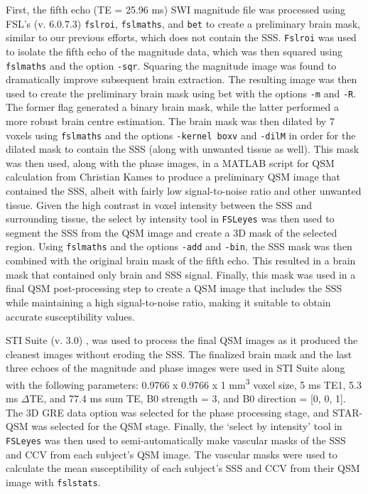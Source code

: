 \documentclass[
true
]{sn-jnl}
\begin{document}
First, the fifth echo (TE = 25.96 ms) SWI magnitude file was processed
using FSL's (v. 6.0.7.3)
\citep{woolrichBayesianAnalysisNeuroimaging2009} \texttt{fslroi},
\texttt{fslmaths}, and \texttt{bet} \citep{smithFastRobustAutomated2002}
to create a preliminary brain mask, similar to our previous efforts,
which does not contain the SSS. \texttt{Fslroi} was used to isolate the
fifth echo of the magnitude data, which was then squared using
\texttt{fslmaths} and the option \texttt{-sqr}. Squaring the magnitude
image was found to dramatically improve subsequent brain extraction. The
resulting image was then used to create the preliminary brain mask using
bet with the options \texttt{-m} and \texttt{-R}. The former flag
generated a binary brain mask, while the latter performed a more robust
brain centre estimation. The brain mask was then dilated by 7 voxels
using \texttt{fslmaths} and the options \texttt{-kernel\ boxv} and
\texttt{-dilM} in order for the dilated mask to contain the SSS (along
with unwanted tissue as well). This mask was then used, along with the
phase images, in a MATLAB script for QSM calculation from Christian
Kames \citep{kamesRapidTwostepDipole2018} to produce a preliminary QSM
image that contained the SSS, albeit with fairly low signal-to-noise
ratio and other unwanted tissue. Given the high contrast in voxel
intensity between the SSS and surrounding tissue, the select by
intensity tool in \texttt{FSLeyes} \citep{mccarthyFSLeyes2023} was then
used to segment the SSS from the QSM image and create a 3D mask of the
selected region. Using \texttt{fslmaths} and the options \texttt{-add}
and \texttt{-bin}, the SSS mask was then combined with the original
brain mask of the fifth echo. This resulted in a brain mask that
contained only brain and SSS signal. Finally, this mask was used in a
final QSM post-processing step to create a QSM image that includes the
SSS while maintaining a high signal-to-noise ratio, making it suitable
to obtain accurate susceptibility values.

STI Suite (v. 3.0) \citep{liIntegratedLaplacianbasedPhase2014}, was used
to process the final QSM images as it produced the cleanest images
without eroding the SSS. The finalized brain mask and the last three
echoes of the magnitude and phase images were used in STI Suite along
with the following parameters: 0.9766 x 0.9766 x 1 mm\textsuperscript{3}
voxel size, 5 ms TE1, 5.3 ms \(\Delta\)TE, and 77.4 ms sum TE, B0
strength = 3, and B0 direction = {[}0, 0, 1{]}. The 3D GRE data option
was selected for the phase processing stage, and STAR-QSM was selected
for the QSM stage. Finally, the `select by intensity' tool in
\texttt{FSLeyes} was then used to semi-automatically make vascular masks
of the SSS and CCV from each subject's QSM image. The vascular masks
were used to calculate the mean susceptibility of each subject's SSS and
CCV from their QSM image with \texttt{fslstats}.
\end{document}
